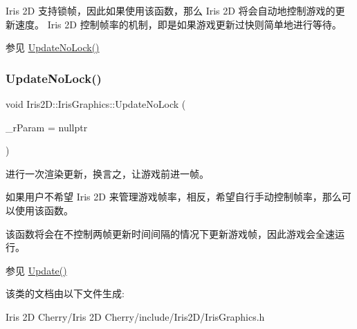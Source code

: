 Iris 2D 支持锁帧，因此如果使用该函数，那么 Iris 2D 将会自动地控制游戏的更新速度。 Iris 2D 控制帧率的机制，即是如果游戏更新过快则简单地进行等待。 \begin{DoxySeeAlso}{参见}
\hyperlink{class_iris2_d_1_1_iris_graphics_adbbca919748bfdd9b84958414debc588}{Update\+No\+Lock()} 
\end{DoxySeeAlso}
\mbox{\label{class_iris2_d_1_1_iris_graphics_adbbca919748bfdd9b84958414debc588}} 
\subsubsection{\texorpdfstring{Update\+No\+Lock()}{UpdateNoLock()}}
{\footnotesize\ttfamily void Iris2\+D\+::\+Iris\+Graphics\+::\+Update\+No\+Lock (\begin{DoxyParamCaption}\item[{Iris\+Result $\ast$}]{\+\_\+r\+Param = {\ttfamily nullptr} }\end{DoxyParamCaption})}



进行一次渲染更新，换言之，让游戏前进一帧。 

如果用户不希望 Iris 2D 来管理游戏帧率，相反，希望自行手动控制帧率，那么可以使用该函数。

该函数将会在不控制两帧更新时间间隔的情况下更新游戏帧，因此游戏会全速运行。 \begin{DoxySeeAlso}{参见}
\hyperlink{class_iris2_d_1_1_iris_graphics_aa25debfc9a08d7084f48711a6bffdc4d}{Update()} 
\end{DoxySeeAlso}


该类的文档由以下文件生成\+:\begin{DoxyCompactItemize}
\item 
Iris 2\+D Cherry/\+Iris 2\+D Cherry/include/\+Iris2\+D/Iris\+Graphics.\+h\end{DoxyCompactItemize}
